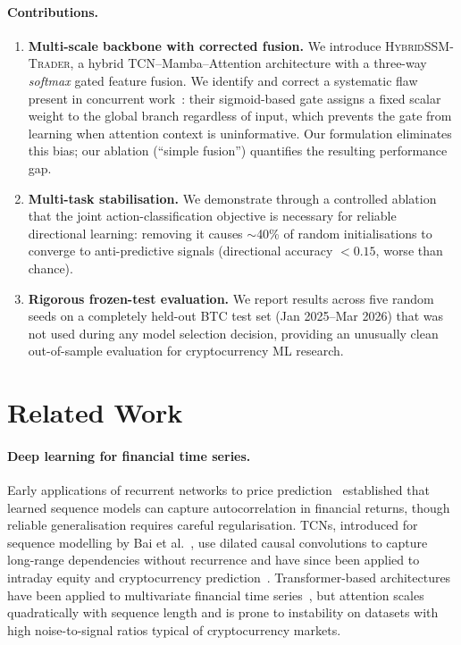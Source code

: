 \documentclass[runningheads]{llncs}
\begin{document}
\paragraph{Contributions.}
\begin{enumerate}
  \item \textbf{Multi-scale backbone with corrected fusion.}
        We introduce \textsc{HybridSSM-Trader}, a hybrid TCN--Mamba--Attention
        architecture with a three-way \emph{softmax} gated feature fusion.
        We identify and correct a systematic flaw present in concurrent
        work~\cite{liu2025alphaseek}: their sigmoid-based gate assigns a
        fixed scalar weight to the global branch regardless of input, which
        prevents the gate from learning when attention context is uninformative.
        Our formulation eliminates this bias; our ablation (``simple fusion'')
        quantifies the resulting performance gap.
  \item \textbf{Multi-task stabilisation.}  We demonstrate through a controlled
        ablation that the joint action-classification objective is necessary for
        reliable directional learning: removing it causes $\sim$40\% of random
        initialisations to converge to anti-predictive signals
        (directional accuracy $< 0.15$, worse than chance).
  \item \textbf{Rigorous frozen-test evaluation.}  We report results across five
        random seeds on a completely held-out BTC test set (Jan 2025--Mar 2026)
        that was not used during any model selection decision, providing an
        unusually clean out-of-sample evaluation for cryptocurrency ML research.
\end{enumerate}

\section{Related Work}
\label{sec:related}

\paragraph{Deep learning for financial time series.}
Early applications of recurrent networks to price prediction~\cite{hochreiter1997long}
established that learned sequence models can capture autocorrelation in financial
returns, though reliable generalisation requires careful regularisation.  TCNs,
introduced for sequence modelling by Bai et al.~\cite{bai2018empirical}, use
dilated causal convolutions to capture long-range dependencies without recurrence
and have since been applied to intraday equity and cryptocurrency
prediction~\cite{sezer2020financial}.  Transformer-based architectures have
been applied to multivariate financial time series~\cite{zhou2021informer},
but attention scales quadratically with sequence length and is prone to instability
on datasets with high noise-to-signal ratios typical of cryptocurrency markets.
\end{document}
